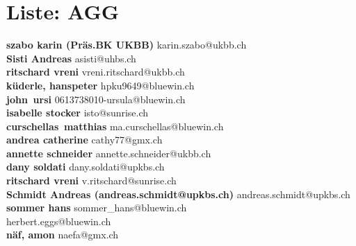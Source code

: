 \documentclass{scrartcl}
\begin{document}
\section*{Liste: AGG}
\textbf{szabo karin (Präs.BK  UKBB) } karin.szabo@ukbb.ch\\
\textbf{Sisti Andreas } asisti@uhbs.ch\\
\textbf{ritschard vreni } vreni.ritschard@ukbb.ch\\
\textbf{küderle, hanspeter } hpku9649@bluewin.ch\\
\textbf{john\, ursi } 0613738010-ursula@bluewin.ch\\
\textbf{isabelle stocker } isto@sunrise.ch\\
\textbf{curschellas\, matthias } ma.curschellas@bluewin.ch\\
\textbf{andrea catherine } cathy77@gmx.ch\\
\textbf{annette schneider } annette.schneider@ukbb.ch\\
\textbf{dany soldati } dany.soldati@upkbs.ch\\
\textbf{ritschard vreni } v.ritschard@sunrise.ch\\
\textbf{Schmidt Andreas (andreas.schmidt@upkbs.ch) } andreas.schmidt@upkbs.ch\\
\textbf{sommer hans } sommer_hans@bluewin.ch\\
\textbf{} herbert.eggs@bluewin.ch\\
\textbf{näf, amon } naefa@gmx.ch\\
\end{document}
